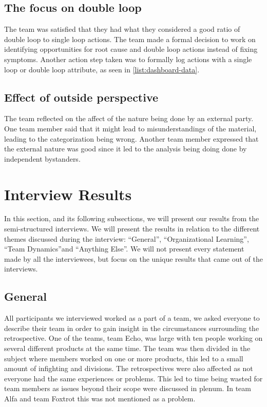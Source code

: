 \subsection{The focus on double loop}
The team was satisfied that they had what they considered a good ratio of double loop to single loop actions. The team made a formal decision to work on identifying opportunities for root cause and double loop actions instead of fixing symptoms. Another action step taken was to formally log actions with a single loop or double loop attribute, as seen in \autoref{list:dashboard-data}.

\subsection{Effect of outside perspective}
The team reflected on the affect of the nature being done by an external party. One team member said that it might lead to misunderstandings of the material, leading to the categorization being wrong. Another team member expressed that the external nature was good since it led to the analysis being doing done by independent bystanders.

\clearpage
\section{Interview Results}
In this section, and its following subsections, we will present our results from the semi-structured interviews. We will present the results in relation to the different themes discussed during the interview: ``General'', ``Organizational Learning'', ``Team Dynamics''and ``Anything Else''. We will not present every statement made by all the interviewees, but focus on the unique results that came out of the interviews. 

\subsection{General} %
\label{sub:general}

All participants we interviewed worked as a part of a team, we asked everyone to describe their team in order to gain insight in the circumstances surrounding the retrospective.  One of the teams, team Echo, was large with ten people working on several different products at the same time. The team was then divided in the subject where members worked on one or more products, this led to a small amount of infighting and divisions. The retrospectives were also affected as not everyone had the same experiences or problems. This led to time being wasted for team members as issues beyond their scope were discussed in plenum. In team Alfa and team Foxtrot this was not mentioned as a problem. 

